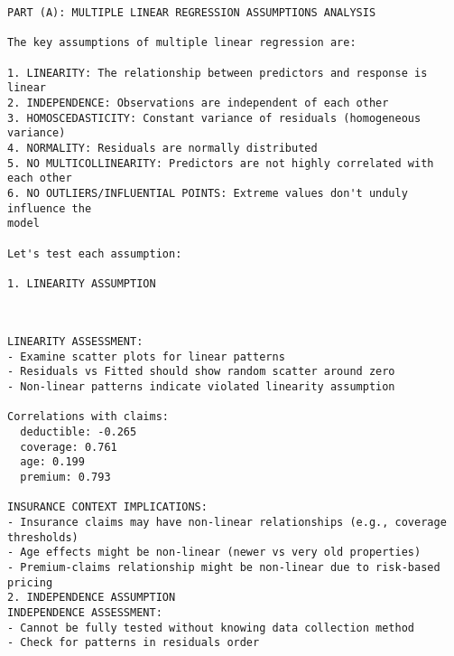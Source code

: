 \documentclass[8pt, twocolumn]{extarticle}
\begin{document}
    \begin{Verbatim}[commandchars=\\\{\}]
PART (A): MULTIPLE LINEAR REGRESSION ASSUMPTIONS ANALYSIS

The key assumptions of multiple linear regression are:

1. LINEARITY: The relationship between predictors and response is linear
2. INDEPENDENCE: Observations are independent of each other
3. HOMOSCEDASTICITY: Constant variance of residuals (homogeneous variance)
4. NORMALITY: Residuals are normally distributed
5. NO MULTICOLLINEARITY: Predictors are not highly correlated with each other
6. NO OUTLIERS/INFLUENTIAL POINTS: Extreme values don't unduly influence the
model

Let's test each assumption:

1. LINEARITY ASSUMPTION
    \end{Verbatim}

    \begin{center}
    \end{center}
    { \hspace*{\fill} \\}
    
    \begin{Verbatim}[commandchars=\\\{\}]
LINEARITY ASSESSMENT:
- Examine scatter plots for linear patterns
- Residuals vs Fitted should show random scatter around zero
- Non-linear patterns indicate violated linearity assumption

Correlations with claims:
  deductible: -0.265
  coverage: 0.761
  age: 0.199
  premium: 0.793

INSURANCE CONTEXT IMPLICATIONS:
- Insurance claims may have non-linear relationships (e.g., coverage thresholds)
- Age effects might be non-linear (newer vs very old properties)
- Premium-claims relationship might be non-linear due to risk-based pricing
2. INDEPENDENCE ASSUMPTION
INDEPENDENCE ASSESSMENT:
- Cannot be fully tested without knowing data collection method
- Check for patterns in residuals order
    \end{Verbatim}

    \begin{center}
    \end{center}
    { \hspace*{\fill} \\}
    
\end{document}
